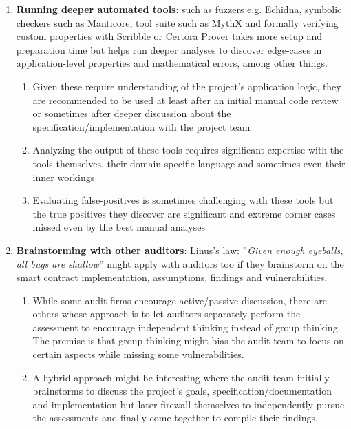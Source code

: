 \begin{enumerate}
\item\textbf{Running deeper automated tools}: such as fuzzers e.g. Echidna, symbolic checkers such as Manticore, tool suite such as MythX and formally verifying custom properties with Scribble or Certora Prover takes more setup and preparation time but helps run deeper analyses to discover edge-cases in application-level properties and mathematical errors, among other things.
	\begin{enumerate}
	\item Given these require understanding of the project’s application logic, they are recommended to be used at least after an initial manual code review or sometimes after deeper discussion about the specification/implementation with the project team
	\item Analyzing the output of these tools requires significant expertise with the tools themselves, their domain-specific language and sometimes even their inner workings
	\item Evaluating false-positives is sometimes challenging with these tools but the true positives they discover are significant and extreme corner cases missed even by the best manual analyses
	\end{enumerate}

\item\textbf{Brainstorming with other auditors}: \href{https://en.wikipedia.org/wiki/Linus's_law}{Linus’s law}: ”\textit{Given enough eyeballs, all bugs are shallow}” might apply with auditors too if they brainstorm on the smart contract implementation, assumptions, findings and vulnerabilities.
	\begin{enumerate}
	\item While some audit firms encourage active/passive discussion, there are others whose approach is to let auditors separately perform the assessment to encourage independent thinking instead of group thinking. The premise is that group thinking might bias the audit team to focus on certain aspects while missing some vulnerabilities.
	\item A hybrid approach might be interesting where the audit team initially brainstorms to discuss the project’s goals, specification/documentation and implementation but later firewall themselves to independently pursue the assessments and finally come together to compile their findings.
	\end{enumerate}


\end{enumerate}
